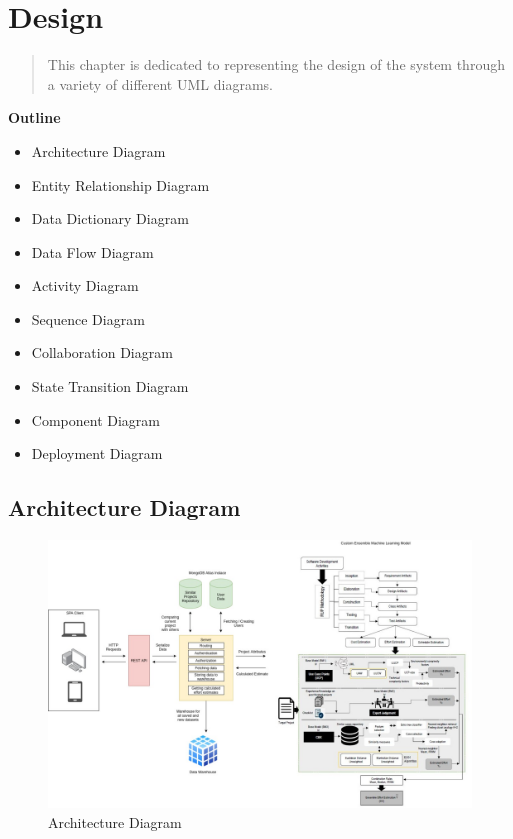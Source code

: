 
\section{Design}

\vspace{20mm}



\begin{abstract}

    This chapter is dedicated to representing the design of the system through a variety of different UML diagrams.


\end{abstract}

\vspace{20mm}

\large{\textbf{Outline}}

\begin{center}
    \begin{itemize}
        \item Architecture Diagram
        \item Entity Relationship Diagram
        \item Data Dictionary Diagram
        \item Data Flow Diagram
        \item Activity Diagram
        \item Sequence Diagram
        \item Collaboration Diagram
        \item State Transition Diagram
        \item Component Diagram
        \item Deployment Diagram
    \end{itemize}
\end{center}
\pagebreak


\subsection{Architecture Diagram}
\begin{figure}[H]
    \centering
    \includegraphics[scale=0.4]{./diagrams/architecture-diagram.jpeg}
    \caption{Architecture Diagram}
    \label{fig:arch-diag}

\end{figure}


